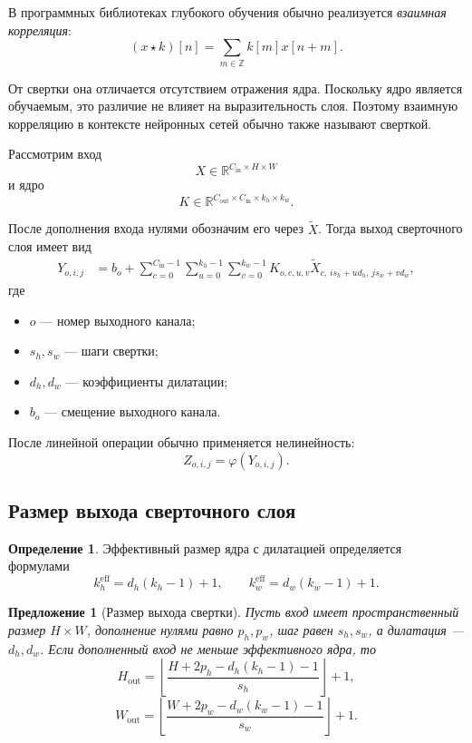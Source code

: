 \documentclass[12pt,a4paper]{article}
\newcommand{\R}{\mathbb{R}}
\numberwithin{equation}{section}
\newtheorem{proposition}[theorem]{Предложение}
\theoremstyle{definition}
\newtheorem{definition}[theorem]{Определение}
\theoremstyle{remark}
\begin{document}
В программных библиотеках глубокого обучения обычно реализуется
\emph{взаимная корреляция}:
\[
    (x\star k)[n]
    =
    \sum_{m\in\mathbb{Z}} k[m]x[n+m].
\]

От свертки она отличается отсутствием отражения ядра. Поскольку ядро
является обучаемым, это различие не влияет на выразительность слоя.
Поэтому взаимную корреляцию в контексте нейронных сетей обычно также
называют сверткой.

Рассмотрим вход
\[
    X\in\R^{C_{\mathrm{in}}\times H\times W}
\]
и ядро
\[
    K\in
    \R^{
        C_{\mathrm{out}}
        \times C_{\mathrm{in}}
        \times k_h\times k_w
    }.
\]

После дополнения входа нулями обозначим его через
\(\widetilde{X}\). Тогда выход сверточного слоя имеет вид
\[
\begin{split}
    Y_{o,i,j}
    &=
    b_o
    +
    \sum_{c=0}^{C_{\mathrm{in}}-1}
    \sum_{u=0}^{k_h-1}
    \sum_{v=0}^{k_w-1}
    K_{o,c,u,v}
    \widetilde{X}_{
        c,\,
        i s_h+u d_h,\,
        j s_w+v d_w
    },
\end{split}
\]
где

\begin{itemize}
    \item \(o\) --- номер выходного канала;
    \item \(s_h,s_w\) --- шаги свертки;
    \item \(d_h,d_w\) --- коэффициенты дилатации;
    \item \(b_o\) --- смещение выходного канала.
\end{itemize}

После линейной операции обычно применяется нелинейность:
\[
    Z_{o,i,j}=\varphi(Y_{o,i,j}).
\]

\subsection{Размер выхода сверточного слоя}

\begin{definition}
Эффективный размер ядра с дилатацией определяется формулами
\[
    k_h^{\mathrm{eff}}=d_h(k_h-1)+1,
    \qquad
    k_w^{\mathrm{eff}}=d_w(k_w-1)+1.
\]
\end{definition}

\begin{proposition}[Размер выхода свертки]
Пусть вход имеет пространственный размер \(H\times W\), дополнение
нулями равно \(p_h,p_w\), шаг равен \(s_h,s_w\), а дилатация ---
\(d_h,d_w\). Если дополненный вход не меньше эффективного ядра, то
\[
    H_{\mathrm{out}}
    =
    \left\lfloor
    \frac{
        H+2p_h-d_h(k_h-1)-1
    }{s_h}
    \right\rfloor+1,
\]
\[
    W_{\mathrm{out}}
    =
    \left\lfloor
    \frac{
        W+2p_w-d_w(k_w-1)-1
    }{s_w}
    \right\rfloor+1.
\]
\end{proposition}
\end{document}

